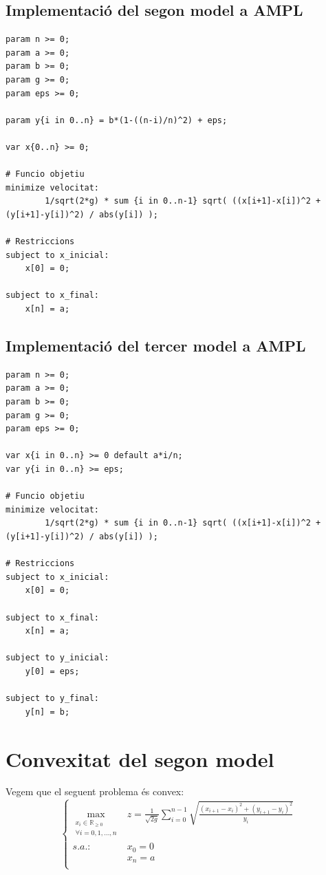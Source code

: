 \documentclass[10pt]{extarticle}
\begin{document}
\subsection{Implementació del segon model a AMPL}
\begin{lstlisting}
param n >= 0;
param a >= 0;
param b >= 0;
param g >= 0;
param eps >= 0;

param y{i in 0..n} = b*(1-((n-i)/n)^2) + eps;

var x{0..n} >= 0;

# Funcio objetiu
minimize velocitat:
		1/sqrt(2*g) * sum {i in 0..n-1} sqrt( ((x[i+1]-x[i])^2 + (y[i+1]-y[i])^2) / abs(y[i]) );

# Restriccions
subject to x_inicial:
	x[0] = 0;

subject to x_final:
	x[n] = a;
\end{lstlisting}

\subsection{Implementació del tercer model a AMPL}
\begin{lstlisting}
param n >= 0;
param a >= 0;
param b >= 0;
param g >= 0;
param eps >= 0;

var x{i in 0..n} >= 0 default a*i/n;
var y{i in 0..n} >= eps;

# Funcio objetiu
minimize velocitat:
		1/sqrt(2*g) * sum {i in 0..n-1} sqrt( ((x[i+1]-x[i])^2 + (y[i+1]-y[i])^2) / abs(y[i]) );

# Restriccions
subject to x_inicial:
	x[0] = 0;

subject to x_final:
	x[n] = a;

subject to y_inicial:
	y[0] = eps;

subject to y_final:
	y[n] = b;
\end{lstlisting}

\section{Convexitat del segon model}
Vegem que el seguent problema és convex:
\begin{equation*}
    \left\{
    \begin{array}{ll}
        \displaystyle{\max\limits_{\substack{x_i \in \mathbb{R}_{\ge0} \\ \forall i = 0,1,\hdots,n}}} & \displaystyle{z = \frac{1}{\sqrt{2g}} \sum_{i = 0}^{n-1} \sqrt{\frac{(x_{i+1}-x_i)^2+(y_{i+1}-y_i)^2}{y_i}}} \\
        s.a.: & \displaystyle{x_0} = 0 \\
        & \displaystyle{x_n} = a \\
    \end{array}
    \right.
\end{equation*}
\end{document}
